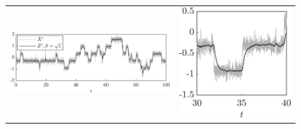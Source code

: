 \documentclass[review,onefignum,onetabnum]{siamonline190516}
\begin{document}
\begin{figure}[t]
\begin{tabular}{cc}
		\includegraphics[]{Figures/TrajD5} & \includegraphics[]{Figures/TrajD5Z} \\

\end{tabular}
\end{figure}
\end{document}
